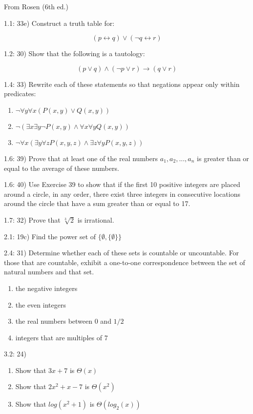 \documentclass{article}
\begin{document}
From Rosen (6th ed.)

1.1: 33e) Construct a truth table for:

\[
(p \leftrightarrow q) \vee (\neg q \leftrightarrow r)
\]

1.2: 30) Show that the following is a tautology:

\[
(p \vee q) \wedge (\neg p \vee r) \rightarrow (q \vee r)
\]

1.4: 33) Rewrite each of these statements so that negations appear only within predicates:

\begin{enumerate}[label=\alph{enumi})]
  \addtocounter{enumi}{2}
\item $ \neg \forall y \forall x (P(x,y) \vee Q(x,y)) $
\item $ \neg ( \exists x \exists y \neg P(x,y) \wedge \forall x \forall y Q(x,y)) $
\item $ \neg \forall x ( \exists y \forall z P(x,y,z) \wedge \exists z \forall y P(x,y,z)) $
\end{enumerate}

1.6: 39) Prove that at least one of the real numbers $a_1,a_2,...,a_n$ is greater than or equal to the average of these numbers.

1.6: 40) Use Exercise 39 to show that if the first 10 positive integers are placed around a circle, in any order, there exist three integers in consecutive locations around the circle that have a sum greater than or equal to 17.

1.7: 32) Prove that $\sqrt[3]{2}$ is irrational.

2.1: 19c) Find the power set of $ \{ \emptyset , \{ \emptyset \} \} $

2.4: 31) Determine whether each of these sets is countable or uncountable.  For those that are countable, exhibit a one-to-one correspondence between the set of natural numbers and that set.

\begin{enumerate}[label=\alph{enumi})]
\item the negative integers
\item the even integers
\item the real numbers between 0 and $1/2$
\item integers that are multiples of 7
\end{enumerate}

3.2: 24)

\begin{enumerate}[label=\alph{enumi})]
\item Show that $3x + 7$ is $\Theta (x)$
\item Show that $2x^2+x-7$ is $\Theta (x^2)$
  \addtocounter{enumi}{1}
\item Show that $log(x^2+1)$ is $\Theta (log_2(x))$
\end{enumerate}
\end{document}
